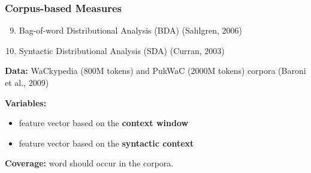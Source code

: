 \documentclass{beamer}
\begin{document}
\begin{frame}
\frametitle{Corpus-based Measures}

\begin{enumerate}
   \setcounter{enumi}{8}
	\item Bag-of-word Distributional Analysis (BDA) (Sahlgren, 2006) 
	\item Syntactic Distributional Analysis (SDA) (Curran, 2003) 
\end{enumerate}

\textbf{Data:} WaCkypedia (800M tokens) and PukWaC (2000M tokens) corpora (Baroni et al., 2009) 
 
\textbf{Variables:} 
\begin{itemize}
  \item feature vector based on the \textbf{context window}
  \item feature vector based on the \textbf{syntactic context} 
\end{itemize}

\textbf{Coverage:} word should occur in the corpora.
	
\end{frame}


 

	
  
  
\end{document}
